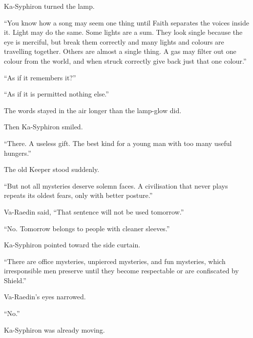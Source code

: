 Ka-Syphiron turned the lamp.\par

“You know how a song may seem one thing until Faith separates the voices inside it.
Light may do the same.
Some lights are a sum.
They look single because the eye is merciful, but break them correctly and many lights and colours are travelling together.
Others are almost a single thing.
A gas may filter out one colour from the world, and when struck correctly give back just that one colour.”\par

“As if it remembers it?”\par

“As if it is permitted nothing else.”\par

The words stayed in the air longer than the lamp-glow did.\par

Then Ka-Syphiron smiled.\par

“There.
A useless gift.
The best kind for a young man with too many useful hungers.”\par




The old Keeper stood suddenly.\par

“But not all mysteries deserve solemn faces.
A civilisation that never plays repeats its oldest fears, only with better posture.”\par

Va-Raedin said, “That sentence will not be used tomorrow.”\par

“No.
Tomorrow belongs to people with cleaner sleeves.”\par

Ka-Syphiron pointed toward the side curtain.\par

“There are office mysteries, unpierced mysteries, and fun mysteries, which irresponsible men preserve until they become respectable or are confiscated by Shield.”\par

Va-Raedin’s eyes narrowed.\par

“No.”\par

Ka-Syphiron was already moving.\par

